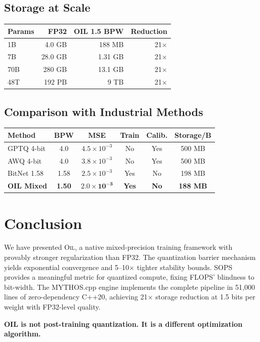\documentclass[11pt,a4paper]{article}
\theoremstyle{definition}
\newcommand{\OIL}{\textsc{Oil}}
\begin{document}
\subsection{Storage at Scale}

\begin{center}
\begin{tabular}{lrrr}
\toprule
\textbf{Params} & \textbf{FP32} & \textbf{OIL 1.5 BPW} & \textbf{Reduction} \\
\midrule
1B & 4.0 GB & 188 MB & 21$\times$ \\
7B & 28.0 GB & 1.31 GB & 21$\times$ \\
70B & 280 GB & 13.1 GB & 21$\times$ \\
48T & 192 PB & 9 TB & 21$\times$ \\
\bottomrule
\end{tabular}
\end{center}

\subsection{Comparison with Industrial Methods}

\begin{center}
\begin{tabular}{lccccc}
\toprule
\textbf{Method} & \textbf{BPW} & \textbf{MSE} & \textbf{Train} & \textbf{Calib.} & \textbf{Storage/B} \\
\midrule
GPTQ 4-bit & 4.0 & $4.5 \times 10^{-3}$ & No & Yes & 500 MB \\
AWQ 4-bit & 4.0 & $3.8 \times 10^{-3}$ & No & Yes & 500 MB \\
BitNet 1.58 & 1.58 & $2.5 \times 10^{-3}$ & Yes & No & 198 MB \\
\textbf{OIL Mixed} & \textbf{1.50} & $\mathbf{2.0 \times 10^{-3}}$ & \textbf{Yes} & \textbf{No} & \textbf{188 MB} \\
\bottomrule
\end{tabular}
\end{center}


\section{Conclusion}
\label{sec:conclusion}

We have presented \OIL{}, a native mixed-precision training framework with provably stronger regularization than FP32. The quantization barrier mechanism yields exponential convergence and 5--10$\times$ tighter stability bounds. SOPS provides a meaningful metric for quantized compute, fixing FLOPS' blindness to bit-width. The MYTHOS.cpp engine implements the complete pipeline in 51{,}000 lines of zero-dependency C++20, achieving 21$\times$ storage reduction at 1.5 bits per weight with FP32-level quality.

\textbf{OIL is not post-training quantization. It is a different optimization algorithm.}

\vfill

\printbibliography
\end{document}
